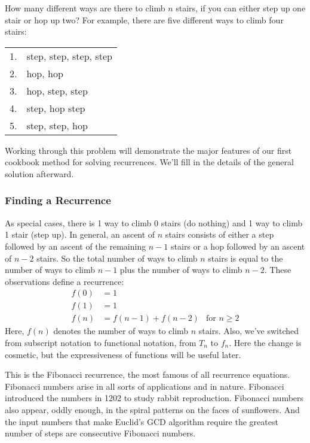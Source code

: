 How many different ways are there to climb $n$ stairs, if you can
either step up one stair or hop up two?  For example, there are five
different ways to climb four stairs:

\vspace{1ex}

\begin{tabular}{rl}
1. & step, step, step, step \\
2. & hop, hop \\
3. & hop, step, step \\
4. & step, hop step \\
5. & step, step, hop
\end{tabular}

\vspace{1ex}

\noindent Working through this problem will demonstrate the major
features of our first cookbook method for solving recurrences.  We'll
fill in the details of the general solution afterward.

\subsubsection{Finding a Recurrence}

As special cases, there is 1 way to climb 0 stairs (do nothing) and 1
way to climb 1 stair (step up).  In general, an ascent of $n$ stairs
consists of either a step followed by an ascent of the remaining $n -
1$ stairs or a hop followed by an ascent of $n - 2$ stairs.  So the
total number of ways to climb $n$ stairs is equal to the number of
ways to climb $n-1$ plus the number of ways to climb $n-2$.  These
observations define a recurrence:
\begin{align*}
f(0) & = 1 \\
f(1) & = 1 \\
f(n) & = f(n-1) + f(n-2) & \text{for $n \geq 2$}
\end{align*}
Here, $f(n)$ denotes the number of ways to climb $n$ stairs.  Also,
we've switched from subscript notation to functional notation, from
$T_n$ to $f_n$.  Here the change is cosmetic, but the expressiveness
of functions will be useful later.

This is the Fibonacci recurrence, the most famous of all recurrence
equations.  Fibonacci numbers arise in all sorts of applications and
in nature. Fibonacci introduced the numbers in 1202 to study rabbit
reproduction. Fibonacci numbers also appear, oddly enough, in the
spiral patterns on the faces of sunflowers. And the input numbers that
make Euclid's GCD algorithm require the greatest number of steps are
consecutive Fibonacci numbers.

